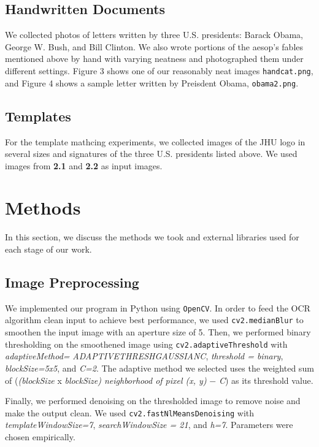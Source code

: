 \documentclass[11pt,letterpaper]{article}
\begin{document}
\subsection{Handwritten Documents}

We collected photos of letters written by three U.S. presidents: Barack Obama, George W. Bush, and Bill Clinton. We also wrote portions of the aesop's fables mentioned above by hand with varying neatness and photographed them under different settings. Figure 3 shows one of our reasonably neat images {\tt hand\textunderscore cat.png}, and Figure 4 shows a sample letter written by Preisdent Obama, {\tt obama2.png}.

\subsection{Templates}

For the template mathcing experiments, we collected images of the JHU logo in several sizes and signatures of the three U.S. presidents listed above. We used images from \textbf{2.1} and \textbf{2.2} as input images.

\section{Methods}

In this section, we discuss the methods we took and external libraries used for each stage of our work.

\subsection{Image Preprocessing}

We implemented our program in Python using {\tt OpenCV}. In order to feed the OCR algorithm clean input to achieve best performance, we used {\tt cv2.medianBlur} to smoothen the input image with an aperture size of 5. Then, we performed binary thresholding on the smoothened image using {\tt cv2.adaptiveThreshold} with \textit{adaptiveMethod=} \textit{ ADAPTIVE\textunderscore THRESH\textunderscore GAUSSIAN\textunderscore C}, \textit{threshold = binary}, \textit{blockSize=5x5}, and \textit{C=2}. The adaptive method we selected uses the weighted sum of (\textit{(blockSize} x \textit{blockSize) neighborhood of pixel (x, y)} $-$ \textit{C}) as its threshold value.

Finally, we performed denoising on the thresholded image to remove noise and make the output clean. We used {\tt cv2.fastNlMeansDenoising} with \textit{templateWindowSize=7}, \textit{searchWindowSize = 21}, and \textit{h=7}. Parameters were chosen empirically.
\end{document}
